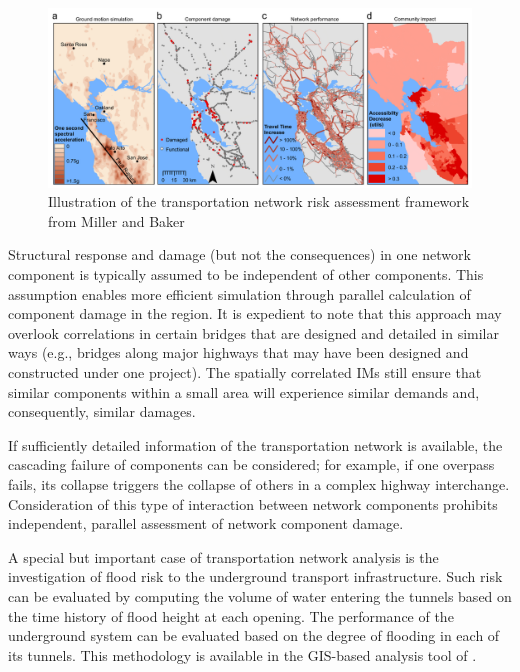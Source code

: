 \begin{figure}[htb]
    \centering
    \includegraphics[width=1.0\textwidth, angle = 0]{Figures/RiskAssessmentFramework.png}
    \caption{Illustration of the transportation network risk assessment framework from Miller and Baker \cite{miller2015estimating}}
    \label{fig:perf_TranspFramework}
\end{figure}

Structural response and damage (but not the consequences) in one network component is typically assumed to be independent of other components. This assumption enables more efficient simulation through parallel calculation of component damage in the region. It is expedient to note that this approach may overlook correlations in certain bridges that are designed and detailed in similar ways (e.g., bridges along major highways that may have been designed and constructed under one project). The spatially correlated IMs still ensure that similar components within a small area will experience similar demands and, consequently, similar damages.

If sufficiently detailed information of the transportation network is available, the cascading failure of components can be considered; for example, if one overpass fails, its collapse triggers the collapse of others in a complex highway interchange. Consideration of this type of interaction between network components prohibits independent, parallel assessment of network component damage.

A special but important case of transportation network analysis is the investigation of flood risk to the underground transport infrastructure. Such risk can be evaluated by computing the volume of water entering the tunnels based on the time history of flood height at each opening. The performance of the underground system can be evaluated based on the degree of flooding in each of its tunnels. This methodology is available in the GIS-based analysis tool of \cite{jacob2011responding}.

